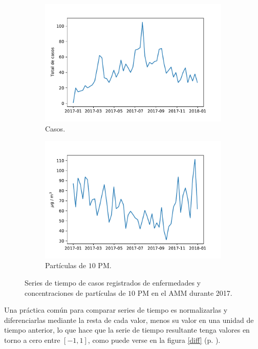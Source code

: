 \documentclass[paper=leter, fontsize=11pt]{scrartcl}
\begin{document}
\begin{figure}
  \begin{subfigure}{.5\textwidth}
      \centering
      \includegraphics[scale=0.4]{2017_ingresos_semana.pdf}
      \caption{Casos.}
  \end{subfigure}
  \begin{subfigure}{0.5\textwidth}
      \centering
      \includegraphics[scale=0.4]{2017_PM10_semana.pdf}
      \caption{Partículas de $10$ PM.}
  \end{subfigure}
  \caption{Series de tiempo de casos registrados de enfermedades y concentraciones de partículas de $10$ PM en el AMM durante 2017.}
  \label{datos}
\end{figure}

Una práctica común para comparar series de tiempo es normalizarlas y diferenciarlas mediante la resta de cada valor, menos su valor en una unidad de tiempo anterior, lo que hace que la serie de tiempo resultante tenga valores en torno a cero entre $[-1, 1]$, como puede verse en la figura \ref{diff} (p. \pageref{diff}).
\end{document}
